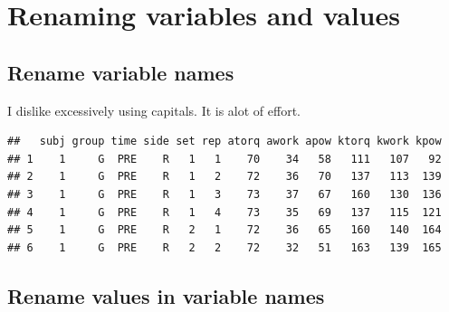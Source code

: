 \documentclass[
]{book}
\newenvironment{Shaded}{\begin{snugshade}}{\end{snugshade}}
\newcommand{\CommentTok}[1]{\textcolor[rgb]{0.56,0.35,0.01}{\textit{#1}}}
\newcommand{\DataTypeTok}[1]{\textcolor[rgb]{0.13,0.29,0.53}{#1}}
\newcommand{\KeywordTok}[1]{\textcolor[rgb]{0.13,0.29,0.53}{\textbf{#1}}}
\newcommand{\NormalTok}[1]{#1}
\newcommand{\OperatorTok}[1]{\textcolor[rgb]{0.81,0.36,0.00}{\textbf{#1}}}
\newcommand{\StringTok}[1]{\textcolor[rgb]{0.31,0.60,0.02}{#1}}
\begin{document}
\hypertarget{renaming-variables-and-values}{%
\section{Renaming variables and values}\label{renaming-variables-and-values}}

\hypertarget{rename-variable-names}{%
\subsection*{Rename variable names}\label{rename-variable-names}}

I dislike excessively using capitals. It is alot of effort.

\begin{Shaded}
\end{Shaded}

\begin{verbatim}
##   subj group time side set rep atorq awork apow ktorq kwork kpow
## 1    1     G  PRE    R   1   1    70    34   58   111   107   92
## 2    1     G  PRE    R   1   2    72    36   70   137   113  139
## 3    1     G  PRE    R   1   3    73    37   67   160   130  136
## 4    1     G  PRE    R   1   4    73    35   69   137   115  121
## 5    1     G  PRE    R   2   1    72    36   65   160   140  164
## 6    1     G  PRE    R   2   2    72    32   51   163   139  165
\end{verbatim}

\hypertarget{rename-values-in-variable-names}{%
\subsection*{Rename values in variable names}\label{rename-values-in-variable-names}}
\end{document}
